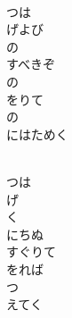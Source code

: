 \documentclass[10pt,b5j]{tarticle} %
\begin{document}
\vspace{1.5em} %
\newcommand{\linespace}{0.5em} %
\newcommand{\blocksize}{0.5\hsize} %
\newcommand{\itemmargin}{3em} %
\begin{enumerate} %
    \setlength{\itemindent}{\itemmargin} %
    \begin{minipage}[c]{\blocksize}
    
        \vspace{\linespace}
        \item~\\
        つは\\
        げよび\\
        の\\
        すべきぞ\\
        の\\
        をりて\\
        の\\
        にはためく
        
    \end{minipage}
    \begin{minipage}[c]{\blocksize}
        
        \vspace{\linespace}
        \item~\\
        つは\\
        げ\\
        く\\
        にちぬ\\
        すぐりて\\
        をれば\\
        つ\\
        えてく
    
    \end{minipage}
\end{enumerate} %
\end{document}
